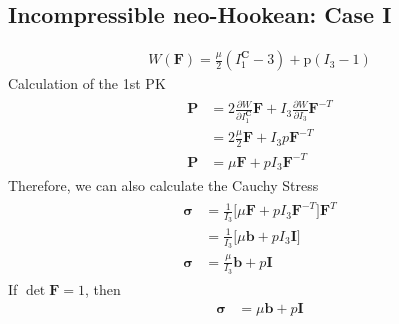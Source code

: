 \documentclass[12pt,3p]{article}
\numberwithin{equation}{section}
\begin{document}
\subsection{Incompressible neo-Hookean: Case I }
\begin{align}
W(\mathbf{F}) = \frac{\mu}{2} (I_1^{\mathbf{C}}  - 3)  + \text{p} (I_3-1)
\end{align}
Calculation of the 1st PK
\begin{align}
\begin{split}
\mathbf{P} &= 2 \frac{\partial W}{\partial I_1^\mathbf{C}} \mathbf{F} + I_3 \frac{\partial W}{\partial I_3} \mathbf{F}^{-T} \\
		&= 2 \frac{\mu}{2} \mathbf{F} + I_3 p \mathbf{F}^{-T} \\
\mathbf{P} &= \mu \mathbf{F} + p I_3 \mathbf{F}^{-T}
\end{split}
\end{align}
Therefore, we can also calculate the Cauchy Stress
\begin{align}
\begin{split}
\boldsymbol{\sigma} &= \frac{1}{I_3} \big[  \mu \mathbf{F} + p I_3 \mathbf{F}^{-T} \big] \mathbf{F}^T \\
				&= \frac{1}{I_3} \big[  \mu \mathbf{b} + p I_3 \mathbf{I} \big] \\
\boldsymbol{\sigma} &= \frac{\mu}{I_3} \mathbf{b} + p \mathbf{I} 
\end{split}
\end{align}
If $ \det \mathbf{F} = 1$, then 
\begin{align}
\boldsymbol{\sigma} &= \mu\mathbf{b} + p \mathbf{I} 
\end{align}
\end{document}
